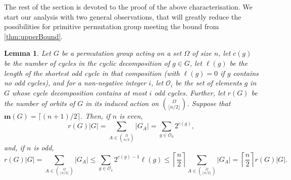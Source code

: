 \documentclass[a4paper]{amsart}
\newcommand{\m}{\mathbf{m}}
\newtheorem{lemma}[theorem]{Lemma}
\theoremstyle{definition}
\begin{document}
The rest of the section is devoted to the proof of the above characterisation.
We start our analysis with two general observations, that will greatly reduce the possibilities for primitive permutation group meeting the bound from \cref{thm:upperBound}.

\begin{lemma}\label{lemma:PrimozRevenge}
    Let $G$ be a permutation group acting on a set $\Omega$ of size $n$, let $c(g)$ be the number of cycles in the cyclic decomposition of $g\in G$, 
    let $\ell(g)$ be the length of the shortest odd cycle in that composition (with $\ell(g) = 0$ if $g$ contains no odd cycles), 
    and for a non-negative integer $i$, let 
    $\mathcal{O}_i$ be the set of elements $g$ in $G$ whose cycle decomposition contains at most $i$ odd cycles.
    Further,
    let $r(G)$ be the number of orbits of $G$ in its induced action on ${\Omega\choose \lfloor n/2\rfloor}$.  Suppose that $\m(G) = \lceil (n+1)/2\rceil$. 
    Then, if $n$ is even,
    \[ r(G) |G|  = \sum_{A \in  {\Omega \choose n/2}}|G_A| = \sum_{g \in \mathcal{O}_0}2^{c(g)}, \]
    and, if $n$ is odd,
        \[  r(G) |G| = \sum_{A \in  {\Omega \choose \lfloor n/2\rfloor}}|G_A| \leq \sum_{g \in \mathcal{O}_1}2^{c(g)-1}\ell(g)\leq  \left \lceil \frac{n}{2}   \right \rceil \sum_{A \in  {\Omega \choose \lfloor n/2\rfloor}}|G_A| =  \left \lceil \frac{n}{2}   \right \rceil r(G) |G|. \]
\end{lemma}
\end{document}
